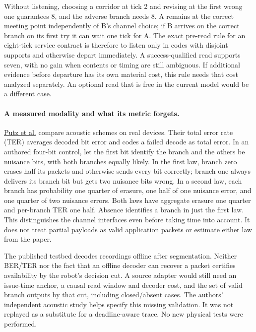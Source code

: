 \documentclass{article}
\begin{document}
Without listening, choosing a corridor at tick 2 and revising at the first wrong one guarantees 8, and the adverse branch needs 8. A remains at the correct meeting point independently of B's channel choice; if B arrives on the correct branch on its first try it can wait one tick for A. The exact pre-read rule for an eight-tick service contract is therefore to listen only in codes with disjoint supports and otherwise depart immediately. A success-qualified read supports seven, with no gain when contents or timing are still ambiguous. If additional evidence before departure has its own material cost, this rule needs that cost analyzed separately. An optional read that is free in the current model would be a different case.

\paragraph{A measured modality and what its metric forgets.}
\href{https://arxiv.org/html/2602.02249v1}{Putz et al.} compare acoustic schemes on real devices. Their total error rate (TER) averages decoded bit error and codes a failed decode as total error. In an authored four-bit control, let the first bit identify the branch and the others be nuisance bits, with both branches equally likely. In the first law, branch zero erases half its packets and otherwise sends every bit correctly; branch one always delivers its branch bit but gets two nuisance bits wrong. In a second law, each branch has probability one quarter of erasure, one half of one nuisance error, and one quarter of two nuisance errors. Both laws have aggregate erasure one quarter and per-branch TER one half. Absence identifies a branch in just the first law. This distinguishes the channel interfaces even before taking time into account. It does not treat partial payloads as valid application packets or estimate either law from the paper.

The published testbed decodes recordings offline after segmentation. Neither BER/TER nor the fact that an offline decoder can recover a packet certifies availability by the robot's decision cut. A source adapter would still need an issue-time anchor, a causal read window and decoder cost, and the set of valid branch outputs by that cut, including closed/absent cases. The authors' independent acoustic study helps specify this missing validation. It was not replayed as a substitute for a deadline-aware trace. No new physical tests were performed.
\end{document}
